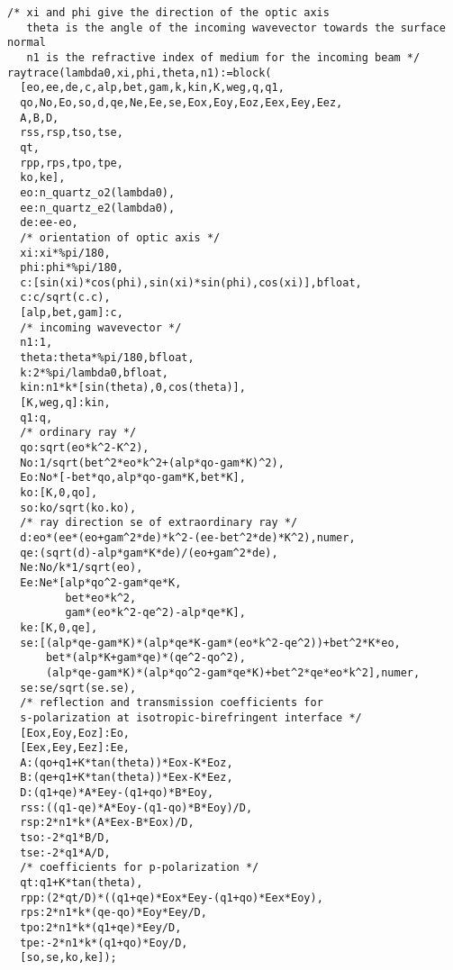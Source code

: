 \begin{lstlisting}
/* xi and phi give the direction of the optic axis
   theta is the angle of the incoming wavevector towards the surface normal
   n1 is the refractive index of medium for the incoming beam */
raytrace(lambda0,xi,phi,theta,n1):=block(
  [eo,ee,de,c,alp,bet,gam,k,kin,K,weg,q,q1,
  qo,No,Eo,so,d,qe,Ne,Ee,se,Eox,Eoy,Eoz,Eex,Eey,Eez,
  A,B,D,
  rss,rsp,tso,tse,
  qt,
  rpp,rps,tpo,tpe,
  ko,ke],
  eo:n_quartz_o2(lambda0),
  ee:n_quartz_e2(lambda0),
  de:ee-eo,
  /* orientation of optic axis */
  xi:xi*%pi/180,
  phi:phi*%pi/180,
  c:[sin(xi)*cos(phi),sin(xi)*sin(phi),cos(xi)],bfloat,
  c:c/sqrt(c.c),
  [alp,bet,gam]:c,
  /* incoming wavevector */
  n1:1,
  theta:theta*%pi/180,bfloat,
  k:2*%pi/lambda0,bfloat,
  kin:n1*k*[sin(theta),0,cos(theta)],
  [K,weg,q]:kin,
  q1:q,
  /* ordinary ray */
  qo:sqrt(eo*k^2-K^2),
  No:1/sqrt(bet^2*eo*k^2+(alp*qo-gam*K)^2),
  Eo:No*[-bet*qo,alp*qo-gam*K,bet*K],
  ko:[K,0,qo],
  so:ko/sqrt(ko.ko),
  /* ray direction se of extraordinary ray */
  d:eo*(ee*(eo+gam^2*de)*k^2-(ee-bet^2*de)*K^2),numer,
  qe:(sqrt(d)-alp*gam*K*de)/(eo+gam^2*de),
  Ne:No/k*1/sqrt(eo),
  Ee:Ne*[alp*qo^2-gam*qe*K,
         bet*eo*k^2,
         gam*(eo*k^2-qe^2)-alp*qe*K],
  ke:[K,0,qe],       
  se:[(alp*qe-gam*K)*(alp*qe*K-gam*(eo*k^2-qe^2))+bet^2*K*eo,
      bet*(alp*K+gam*qe)*(qe^2-qo^2),
      (alp*qe-gam*K)*(alp*qo^2-gam*qe*K)+bet^2*qe*eo*k^2],numer,
  se:se/sqrt(se.se),
  /* reflection and transmission coefficients for
  s-polarization at isotropic-birefringent interface */
  [Eox,Eoy,Eoz]:Eo,
  [Eex,Eey,Eez]:Ee,
  A:(qo+q1+K*tan(theta))*Eox-K*Eoz,
  B:(qe+q1+K*tan(theta))*Eex-K*Eez,
  D:(q1+qe)*A*Eey-(q1+qo)*B*Eoy,
  rss:((q1-qe)*A*Eoy-(q1-qo)*B*Eoy)/D,
  rsp:2*n1*k*(A*Eex-B*Eox)/D,
  tso:-2*q1*B/D,
  tse:-2*q1*A/D,
  /* coefficients for p-polarization */
  qt:q1+K*tan(theta),
  rpp:(2*qt/D)*((q1+qe)*Eox*Eey-(q1+qo)*Eex*Eoy),
  rps:2*n1*k*(qe-qo)*Eoy*Eey/D,
  tpo:2*n1*k*(q1+qe)*Eey/D,
  tpe:-2*n1*k*(q1+qo)*Eoy/D,
  [so,se,ko,ke]);


\end{lstlisting}
